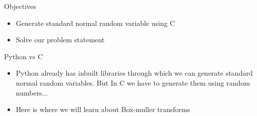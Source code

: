 \documentclass{beamer}
\begin{document}
\newenvironment{amatrix}[1]{%
  \left(\begin{array}{@{}*{#1}{c}|c@{}}
}{%
  \end{array}\right)
}
\newcommand{\cosec}{\,\text{cosec}\,}
\providecommand{\dec}[2]{\ensuremath{\overset{#1}{\underset{#2}{\gtrless}}}}
\newcommand{\myvec}[1]{\ensuremath{\begin{pmatrix}#1\end{pmatrix}}}
\newcommand{\mydet}[1]{\ensuremath{\begin{vmatrix}#1\end{vmatrix}}}
\newcommand{\myaugvec}[2]{\ensuremath{\begin{amatrix}{#1}#2\end{amatrix}}}
\providecommand{\rank}{\text{rank}}
\providecommand{\pr}[1]{\ensuremath{\Pr\left(#1\right)}}
\providecommand{\qfunc}[1]{\ensuremath{Q\left(#1\right)}}
	\newcommand*{\permcomb}[4][0mu]{{{}^{#3}\mkern#1#2_{#4}}}
\newcommand*{\perm}[1][-3mu]{\permcomb[#1]{P}}
\newcommand*{\comb}[1][-1mu]{\permcomb[#1]{C}}
\providecommand{\qfunc}[1]{\ensuremath{Q\left(#1\right)}}
\providecommand{\gauss}[2]{\mathcal{N}\ensuremath{\left(#1,#2\right)}}
\providecommand{\diff}[2]{\ensuremath{\frac{d{#1}}{d{#2}}}}
\providecommand{\myceil}[1]{\left \lceil #1 \right \rceil }
\newcommand\figref{Fig.~\ref}
\newcommand\tabref{Table~\ref}
\newcommand{\sinc}{\,\text{sinc}\,}
\newcommand{\rect}{\,\text{rect}\,}

\begin{frame}
  \titlepage
\end{frame}

\begin{frame}{Objectives}
  \begin{itemize}
  \item Generate standard normal random variable using C
  \item Solve our problem statement 
  \end{itemize}
\end{frame}

\begin{frame}{Python vs C}
  \begin{itemize}
  \item Python already has inbuilt libraries through which we can generate standard normal random variables. But In C we have to generate them using random numbers...
  \item Here is where we will learn about Box-muller transforms 
  \end{itemize}
\end{frame}
\end{document}
